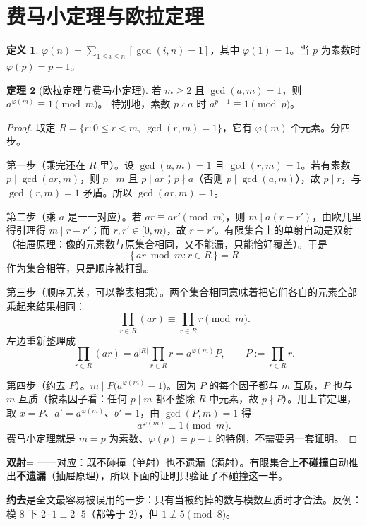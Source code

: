 \documentclass[UTF8,a4paper,11pt,twoside,openright,fontset=fandol]{ctexbook}
\theoremstyle{definition}
\newtheorem{definition}{定义}[chapter]
\newtheorem{theorem}[definition]{定理}
\newcommand{\iva}[1]{\left[#1\right]}
\begin{document}
\section{费马小定理与欧拉定理}
\begin{definition}
$\varphi(n)=\sum_{1\le i\le n}\iva{\gcd(i,n)=1}$，其中 $\varphi(1)=1$。当 $p$ 为素数时 $\varphi(p)=p-1$。
\end{definition}
\begin{theorem}[欧拉定理与费马小定理]
若 $m\ge2$ 且 $\gcd(a,m)=1$，则 $a^{\varphi(m)}\equiv1\pmod m$。
特别地，素数 $p\nmid a$ 时 $a^{p-1}\equiv1\pmod p$。
\end{theorem}
\begin{proof}
取定 $R=\{r:0\le r<m,\ \gcd(r,m)=1\}$，它有 $\varphi(m)$ 个元素。分四步。

第一步（乘完还在 $R$ 里）。设 $\gcd(a,m)=1$ 且 $\gcd(r,m)=1$。若有素数 $p\mid\gcd(ar,m)$，则 $p\mid m$ 且 $p\mid ar$；$p\nmid a$（否则 $p\mid\gcd(a,m)$），故 $p\mid r$，与 $\gcd(r,m)=1$ 矛盾。所以 $\gcd(ar,m)=1$。

第二步（乘 $a$ 是一一对应）。若 $ar\equiv ar'\pmod m$，则 $m\mid a(r-r')$，由欧几里得引理得 $m\mid r-r'$；而 $r,r'\in[0,m)$，故 $r=r'$。有限集合上的单射自动是双射（抽屉原理：像的元素数与原集合相同，又不能漏，只能恰好覆盖）。于是
\[
 \{\,ar\bmod m:r\in R\,\}=R
\]
作为集合相等，只是顺序被打乱。

第三步（顺序无关，可以整表相乘）。两个集合相同意味着把它们各自的元素全部乘起来结果相同：
\[
 \prod_{r\in R}(ar)\equiv\prod_{r\in R}r\pmod m.
\]
左边重新整理成
\[
 \prod_{r\in R}(ar)=a^{|R|}\prod_{r\in R}r=a^{\varphi(m)}P,\qquad P:=\prod_{r\in R}r .
\]

第四步（约去 $P$）。$m\mid P\big(a^{\varphi(m)}-1\big)$。因为 $P$ 的每个因子都与 $m$ 互质，$P$ 也与 $m$ 互质（按素因子看：任何 $p\mid m$ 都不整除 $R$ 中元素，故 $p\nmid P$）。用上节定理，取 $x=P$、$a'=a^{\varphi(m)}$、$b'=1$，由 $\gcd(P,m)=1$ 得
\[
 a^{\varphi(m)}\equiv1\pmod m.
\]
费马小定理就是 $m=p$ 为素数、$\varphi(p)=p-1$ 的特例，不需要另一套证明。
\end{proof}

\begin{tip}[词义：双射（这里为何只验一半）]
\textbf{双射}= 一一对应：既不碰撞（单射）也不遗漏（满射）。有限集合上\textbf{不碰撞}自动推出\textbf{不遗漏}（抽屉原理），所以下面的证明只验证了不碰撞这一半。
\end{tip}

\begin{tip}[小心：约去必须互质]
\textbf{约去}是全文最容易被误用的一步：只有当被约掉的数与模数互质时才合法。反例：模 $8$ 下 $2\cdot1\equiv2\cdot5$（都等于 $2$），但 $1\not\equiv5\pmod 8$。
\end{tip}
\end{document}
